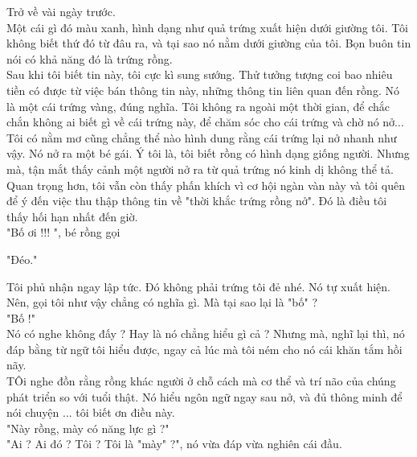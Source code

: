 	Trở về vài ngày trước. \\
	
	Một cái gì đó màu xanh, hình dạng như quả trứng xuất hiện dưới giường tôi. Tôi không biết thứ đó từ đâu ra, và tại sao nó nằm dưới giường của tôi. Bọn buôn tin nói có khả năng đó là trứng rồng. \\ 
	
	Sau khi tôi biết tin này, tôi cực kì sung sướng. Thử tưởng tượng coi bao nhiêu tiền có được từ việc bán thông tin này, những thông tin liên quan đến rồng. Nó là một cái trứng vàng, đúng nghĩa. Tôi không ra ngoài một thời gian, để chắc chắn không ai biết gì về cái trứng này, để chăm sóc cho cái trứng và chờ nó nở... \\
	
	Tôi có nằm mơ cũng chẳng thể nào hình dung rằng cái trứng lại nở nhanh như vậy. Nó nở ra một bé gái. Ý tôi là, tôi biết rồng có hình dạng giống người. Nhưng mà, tận mắt thấy cảnh một người nở ra từ quả trứng nó kinh dị không thể tả. \\
	
	Quan trọng hơn, tôi vẫn còn thấy phấn khích vì cơ hội ngàn vàn này và tôi quên để ý đến việc thu thập thông tin về "thời khắc trứng rồng nở". Đó là điều tôi thấy hối hạn nhất đến giờ. \\
	
	"Bố ơi !!! ", bé rồng gọi
	
	"Đéo." 
	
	Tôi phủ nhận ngay lập tức. Đó không phải trứng tôi đẻ nhé. Nó tự xuất hiện. Nên, gọi tôi như vậy chẳng có nghĩa gì. Mà tại sao lại là "bố" ? \\
	
	"Bố !"\\
	
	Nó có nghe không đấy ? Hay là nó chẳng hiểu gì cả ? Nhưng mà, nghĩ lại thì, nó đáp bằng từ ngữ tôi hiểu được, ngay cả lúc mà tôi ném cho nó cái khăn tắm hồi nãy. \\
	
	TÔi nghe đồn rằng rồng khác người ở chỗ cách mà cơ thể và trí não của chúng phát triển so với tuổi thật. Nó hiểu ngôn ngữ ngay sau nở, và đủ thông minh để nói chuyện ... tôi biết ơn điều này. \\
	
	"Này rồng, mày có năng lực gì ?" \\
	
	"Ai ? Ai đó ? Tôi ? Tôi là "mày"  ?", nó vừa đáp vừa nghiên cái đầu.\\
	
